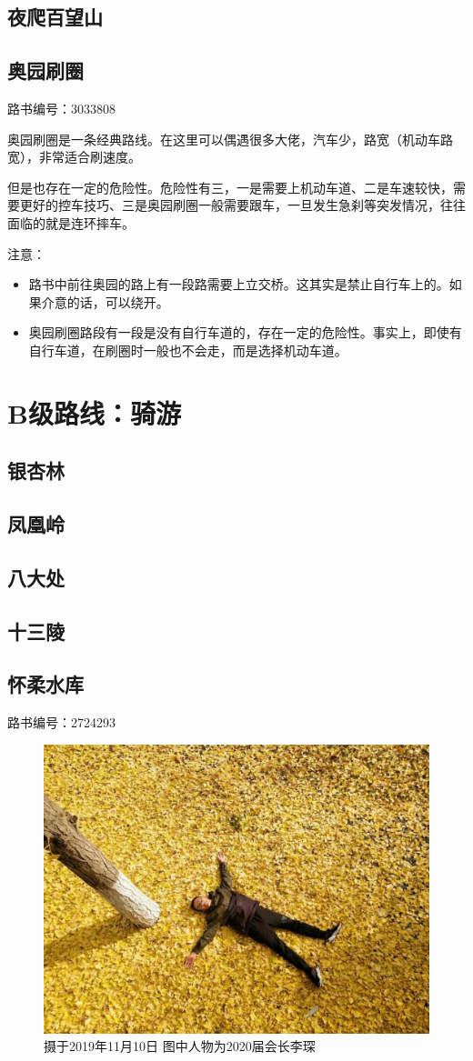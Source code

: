 \documentclass{ctexbook}
\begin{document}
\subsection{夜爬百望山}
\subsection{奥园刷圈}
路书编号：3033808 

奥园刷圈是一条经典路线。在这里可以偶遇很多大佬，汽车少，路宽（机动车路宽），非常适合刷速度。

但是也存在一定的危险性。危险性有三，一是需要上机动车道、二是车速较快，需要更好的控车技巧、三是奥园刷圈一般需要跟车，一旦发生急刹等突发情况，往往面临的就是连环摔车。

注意：
\begin{itemize}
    \item 路书中前往奥园的路上有一段路需要上立交桥。这其实是禁止自行车上的。如果介意的话，可以绕开。
    \item 奥园刷圈路段有一段是没有自行车道的，存在一定的危险性。事实上，即使有自行车道，在刷圈时一般也不会走，而是选择机动车道。
\end{itemize}
\section{B级路线：骑游}
\subsection{银杏林}
\subsection{凤凰岭}
\subsection{八大处}
\subsection{十三陵}
\subsection{怀柔水库}
路书编号：2724293
\begin{figure}[ht]
    \centering
    \includegraphics[width=0.8 \textwidth]{fig/怀柔水库1.jpg}
    \caption{摄于2019年11月10日 图中人物为2020届会长李琛}
\end{figure}
\end{document}
